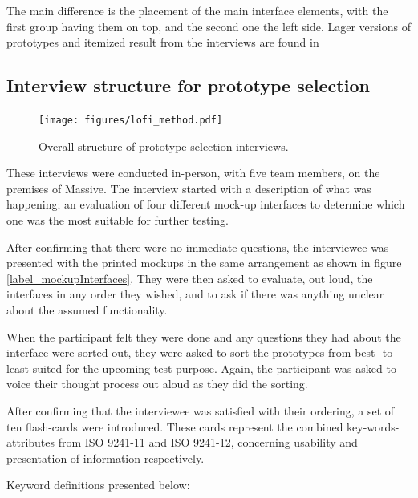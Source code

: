 \documentclass[nofilelist,dvipsnames]{cslthse-msc}
\begin{document}
{      The main difference is the placement of the main interface elements, with
      the first group having them on top, and the second one the left side.
      Lager versions of prototypes and itemized result from the interviews are
      found in 

      \subsection{Interview structure for prototype selection}

        \begin{figure}[h!]
          \centering
          \texttt{[image: figures/lofi\_method.pdf]}
          \caption{Overall structure of prototype selection interviews.}
        \end{figure}

        These interviews were conducted in-person, with five team members, on
        the premises of Massive. The interview started with a description of
        what was happening; an evaluation of four different mock-up interfaces
        to determine which one was the most suitable for further testing.

        After confirming that there were no immediate questions, the
        interviewee was presented with the printed mockups in the same
        arrangement as shown in figure \ref{label_mockupInterfaces}. They were
        then asked to evaluate, out loud, the interfaces in any order they
        wished, and to ask if there was anything unclear about the assumed
        functionality.

        When the participant felt they were done and any questions they had
        about the interface were sorted out, they were asked to sort the
        prototypes from best- to least-suited for the upcoming test purpose.
        Again, the participant was asked to voice their thought process out
        aloud as they did the sorting.

        After confirming that the interviewee was satisfied with their
        ordering, a set of ten flash-cards were introduced. These cards
        represent the combined key-words-attributes from ISO 9241-11{\findref}
        and ISO 9241-12{\findref}, concerning usability and presentation of
        information respectively.

        Keyword definitions presented below:

}
\end{document}

